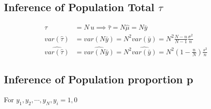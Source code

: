 \documentclass{article}
\theoremstyle{definition}
\theoremstyle{thrm}
\theoremstyle{lma}
\theoremstyle{ppst}
\theoremstyle{crlr}
\begin{document}
\subsection{Inference of Population Total $\tau$}
\begin{align*}
	\tau &= N\,u \implies \hat{\tau} = N\hat{\mu} = N\bar{y}\\
	var(\hat{\tau}) &= var(N\bar{y}) = N^2var(\bar{y}) = N^2 \frac{N-n}{N-1}\frac{\sigma^2}{n}\\
	\widehat{var(\hat{\tau})} &= \widehat{var(N\bar{y})} = N^2 \widehat{var(\bar{y})} = N^2 (1-\frac{n}{N})\frac{s^2}{n}
\end{align*}

\subsection{Inference of Population proportion p}
For $y_1, y_2,\cdots, y_N, y_i = 1,0$
\end{document}
